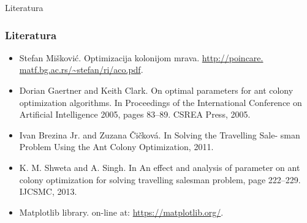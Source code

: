 \documentclass[11pt]{beamer}
\begin{document}
\begin{frame}{Literatura}
  \frametitle{Literatura}
  {\small
    \begin{itemize}
    \item Stefan Mišković. Optimizacija kolonijom mrava. \url{http://poincare.
matf.bg.ac.rs/~stefan/ri/aco.pdf}.
    \item Dorian Gaertner and Keith Clark. On optimal parameters for ant
colony optimization algorithms. In Proceedings of the International
Conference on Artificial Intelligence 2005, pages 83–89. CSREA Press,
2005.
    \item Ivan Brezina Jr. and Zuzana Čičková. In Solving the Travelling Sale-
sman Problem Using the Ant Colony Optimization, 2011.
    \item K. M. Shweta and A. Singh. In An effect and analysis of parameter on
ant colony optimization for solving travelling salesman problem, page
222–229. IJCSMC, 2013.
	\item Matplotlib library. on-line at: \url{https://matplotlib.org/}.
    \end{itemize}
  }
\end{frame}

\begin{frame}{}
\end{frame}
\end{document}
